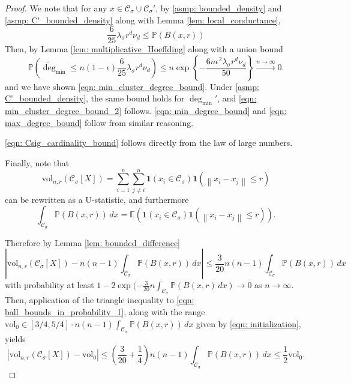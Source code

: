 \documentclass[11pt,twoside]{article}
\newcommand{\set}[1]{\left\{#1\right\}}
\newcommand{\vol}{\mathrm{vol}}
\newcommand{\abs}[1]{\left \lvert #1 \right \rvert}
\newcommand{\norm}[1]{\left\lVert#1\right\rVert}
\newcommand{\1}{\mathbf{1}}
\newcommand{\Xbf}{X}             %
\newcommand{\Pbb}{\mathbb{P}}
\newcommand{\Ebb}{\mathbb{E}}
\newcommand{\Cset}{\mathcal{C}}
\newcommand{\Csig}{\Cset_{\sigma}}
\newcommand{\degminpr}{\deg_{\min}'}
\newcommand{\degminwt}{\widetilde{\deg}_{\min}}
\newcommand{\dx}{\,dx}
\begin{document}
\begin{proof}
	We note that for any $x \in \Csig \cup \Csig'$, by \ref{asmp: bounded_density} and \ref{asmp: C'_bounded_density} along with Lemma \ref{lem: local_conductance},
	\begin{equation*}
	\frac{6}{25} \lambda_{\sigma} r^d \nu_d \leq \Pbb(B(x,r))
	\end{equation*}
	Then, by Lemma \ref{lem: multiplicative_Hoeffding} along with a union bound
	\begin{equation*}
	\Pbb \left(\degminwt \leq n (1 - \epsilon) \frac{6}{25}  \lambda_{\sigma} r^d \nu_d \right) \leq n \exp\set{- \frac{6 n \epsilon^2  \lambda_{\sigma} r^d \nu_d}{50} } \overset{n \to \infty}{\longrightarrow} 0.
	\end{equation*}
	and we have shown \eqref{eqn: min_cluster_degree_bound}. Under \ref{asmp: C'_bounded_density}, the same bound holds for $\degminpr$, and \eqref{eqn: min_cluster_degree_bound_2} follows. \eqref{eqn: min_degree_bound} and \eqref{eqn: max_degree_bound} follow from similar reasoning.
	
	\eqref{eqn: Csig_cardinality_bound} follows directly from the law of large numbers.
	
	Finally, note that
	\begin{equation*}
	\vol_{n,r}(\Csig[\Xbf]) = \sum_{i = 1}^{n} \sum_{j \neq i}^{n} \1(x_i \in \Csig) \1(\norm{x_i - x_j} \leq r)
	\end{equation*}
	can be rewritten as a U-statistic, and furthermore
	\begin{equation*}
	\int_{\Csig} \Pbb(B(x,r)) \dx = \Ebb\left(\1(x_i \in \Csig) \1(\norm{x_i - x_j} \leq r)\right).
	\end{equation*}
	
	Therefore by Lemma \ref{lem: bounded_difference}
	\begin{equation}
	\label{eqn: ball_bounds_in_probability_1}
	\abs{\vol_{n,r}(\Csig[\Xbf]) - n(n-1)\int_{\Csig} \Pbb(B(x,r)) \dx }\leq \frac{3}{20}n(n-1)\int_{\Csig} \Pbb(B(x,r)) \dx 
	\end{equation}
	with probability at least $1 - 2\exp(-\frac{3}{20}n \int_{\Csig} \Pbb(B(x,r) \dx) \to 0$ as $n \to \infty$. Then, application of the triangle inequality to \eqref{eqn: ball_bounds_in_probability_1}, along with the range $\vol_0 \in [3/4,5/4] \cdot n(n-1)\int_{\Csig} \Pbb(B(x,r)) \dx$ given by \eqref{eqn: initialization}, yields
	\begin{equation*}
	\abs{\vol_{n,r}(\Csig[\Xbf]) - \vol_0} \leq \left(\frac{3}{20} + \frac{1}{4}\right) n(n-1)\int_{\Csig} \Pbb(B(x,r)) \dx \leq \frac{1}{2} \vol_0.
	\end{equation*}
	

\end{proof}
\end{document}
